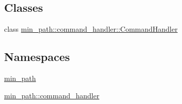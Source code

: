 \subsection*{Classes}
\begin{DoxyCompactItemize}
\item 
class \hyperlink{a00003}{min\+\_\+path\+::command\+\_\+handler\+::\+Command\+Handler}
\end{DoxyCompactItemize}
\subsection*{Namespaces}
\begin{DoxyCompactItemize}
\item 
 \hyperlink{a00033}{min\+\_\+path}
\item 
 \hyperlink{a00035}{min\+\_\+path\+::command\+\_\+handler}
\end{DoxyCompactItemize}
